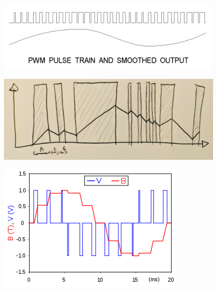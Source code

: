 \par
\begin{figure}[H]
\centering
 \includegraphics[width=\textwidth]{imgs/pwm/original.png}
 \end{figure}
\par
\par
\begin{figure}[H]
\centering
 \includegraphics[width=\textwidth]{imgs/pwm/reconstructed.png}
 \end{figure}
\par
\par
\begin{figure}[H]
\centering
 \includegraphics[width=\textwidth]{imgs/pwm/reconstructed2.png}
 \end{figure}
\par

